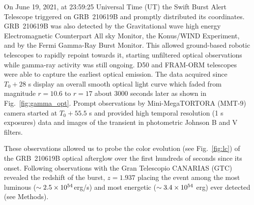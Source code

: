 \documentclass{naturesubmissionstyle}
\begin{document}
\newpage 

On June 19, 2021, at 23:59:25 Universal Time (UT) the Swift Burst Alert Telescope triggered on GRB~210619B\cite{gcn_swift_bat} 
and promptly distributed its coordinates. GRB~210619B was also detected by the Gravitational wave high energy Electromagnetic Counterpart All sky Monitor\cite{gcn_gecam}, the Konus/WIND Experiment\cite{gcn_konus}, and by the Fermi Gamma-Ray Burst Monitor\cite{gcn_fermi}. This allowed ground-based robotic telescopes to rapidly repoint towards it, starting unfiltered optical observations while gamma-ray activity was still ongoing. D50\cite{d50,gcn_d50} and FRAM-ORM\cite{fram_la_palma} telescopes were able to capture the earliest optical emission. The data acquired %
since $T_0+28$ s display an overall smooth optical light curve
which faded from magnitude $r=10.6$ to $r=17$ about 3000 seconds later as shown in Fig.~\ref{fig:gamma_opt}. Prompt observations by Mini-MegaTORTORA (MMT-9) camera\cite{beskin_mmt_2017}
started at $T_0+55.5$ s and %
provided %
high temporal resolution (1 s exposures) data and images of the transient in photometric Johnson B and V filters. 

These observations allowed us to probe the color evolution (see Fig.~\ref{fig:lc}) of the GRB~210619B optical afterglow over the first hundreds of seconds since its onset.
Following observations with the Gran Telescopio CANARIAS (GTC) revealed\cite{gcn_redshift} the redshift of the burst, $z=1.937$ placing the event among the most luminous ($\rm \sim 2.5 \times 10^{54}$erg/s) and most energetic ($\rm \sim 3.4 \times 10^{54}$ erg) ever detected (see Methods). 
\end{document}
